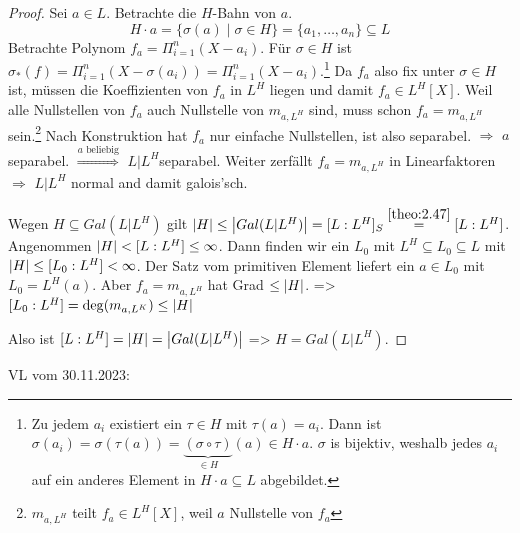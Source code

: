 \documentclass[../main.tex]{subfiles}
\begin{document}
\begin{proof}
    Sei $a\in L$. Betrachte die $H$-Bahn von $a$.
    $$H\cdot a = \{\sigma(a)\mid \sigma\in H\} = \{a_1,\dots, a_n\} \subseteq L$$
    Betrachte Polynom $f_a = \Pi_{i=1}^n (X-a_i)$.
    Für $\sigma\in H$ ist $\sigma_*(f) = \Pi_{i=1}^n\left(X-\sigma(a_i)\right) = \Pi_{i=1}^n(X-a_i)$.\footnote{Zu jedem $a_i$ existiert ein $\tau\in H$ mit $\tau(a) = a_i$. Dann ist $\sigma(a_i) = \sigma(\tau(a)) = \underbrace{(\sigma\circ \tau)}_{\in H}(a)\in H\cdot a$.
    $\sigma$ is bijektiv, weshalb jedes $a_i$ auf ein anderes Element in $H\cdot a\subseteq L$ abgebildet.}
    Da $f_a$ also fix unter $\sigma\in H$ ist, müssen die Koeffizienten von $f_a$ in $L^H$ liegen und damit $f_a\in L^H[X]$.
    Weil alle Nullstellen von $f_a$ auch Nullstelle von $m_{a,L^H}$ sind, muss schon $f_a=m_{a,L^H}$ sein.\footnote{$m_{a,L^H}$ teilt $f_a\in L^H[X]$, weil $a$ Nullstelle von $f_a$}
    Nach Konstruktion hat $f_a$ nur einfache Nullstellen, ist also separabel. $\Rightarrow$ $a$ separabel. $\overset{a\text{ beliebig}}{\Rightarrow}$ $L|L^H$separabel.
    Weiter zerfällt $f_a=m_{a,L^H}$ in Linearfaktoren $\Rightarrow$ $L|L^H$ normal and damit galois'sch.

    Wegen $H\subseteq Gal(L|L^H)$ gilt $\card{H}\leq \card{Gal(L|L^H)} = [L:L^H]_S \overset{\cref{theo:2.47}}{=} [L:L^H]$.
    Angenommen $\left\vert H \right\vert < [L:L^H]\leq \infty$. 
    Dann finden wir ein $L_0$ mit $L^H\subseteq L_0 \subseteq L$ mit $\left\vert H \right\vert \leq [L_0:L^H] <\infty$.
    Der Satz vom primitiven Element liefert ein $a\in L_0$ mit $L_0 = L^H(a)$.
    Aber $f_a=m_{a,L^H}$ hat Grad $\leq \left\vert H \right\vert$.
    => $[L_0:L^H] = \deg(m_{a,L^K})\leq \left\vert H \right\vert$ \Lightning

    Also ist $[L:L^H] = \left\vert H \right\vert = \left\vert Gal(L|L^H) \right\vert$
    => $H=Gal(L|L^H)$.
\end{proof}
\begin{flushright}
VL vom 30.11.2023:
\end{flushright}
\end{document}
